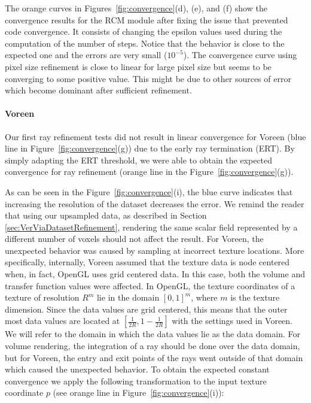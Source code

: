 The orange curves in Figures~\ref{fig:convergence}(d), (e), and (f)
show the convergence results for the RCM module after fixing the issue
that prevented code convergence. It consists of changing the epsilon
values used during the computation of the number of steps. Notice that
the behavior is close to the expected one and the errors are very
small ($10^{-5}$). The convergence curve using pixel size refinement
is close to linear for large pixel size but seems to be converging to
some positive value. This might be due to other sources of error which
become dominant after sufficient refinement.


\paragraph*{Voreen}

Our first ray refinement tests did not result in linear convergence
for Voreen (blue line in Figure~\ref{fig:convergence}(g)) due to the
early ray termination (ERT). By simply adapting the ERT threshold, we
were able to obtain the expected convergence for ray refinement
(orange line in the Figure~\ref{fig:convergence}(g)).

As can be seen in the Figure~\ref{fig:convergence}(i), the blue curve
indicates that increasing the resolution of the dataset decreases the
error.  We remind the reader that using our upsampled data, as
described in Section \ref{sec:VerViaDatasetRefinement}, rendering the
same scalar field represented by a different number of voxels should
not affect the result.  For Voreen, the unexpected behavior was caused
by sampling at incorrect texture locations.  More specifically,
internally, Voreen assumed that the texture data is node centered
when, in fact, OpenGL uses grid centered data. In this case, both the
volume and transfer function values were affected. In OpenGL, the
texture coordinates of a texture of resolution $R^m$ lie in the domain
$[0, 1]^m$, where $m$ is the texture dimension. Since the data values
are grid centered, this means that the outer most data values are
located at $[\frac{1}{2R}, 1-\frac{1}{2R}]$ with the settings used in
Voreen.  We will refer to the domain in which the data values lie as
the data domain.  For volume rendering, the integration of a ray
should be done over the data domain, but for Voreen, the entry and
exit points of the rays went outside of that domain which caused the
unexpected behavior.  To obtain the expected constant convergence we
apply the following transformation to the input texture coordinate $p$
(see orange line in Figure~\ref{fig:convergence}(i)):

